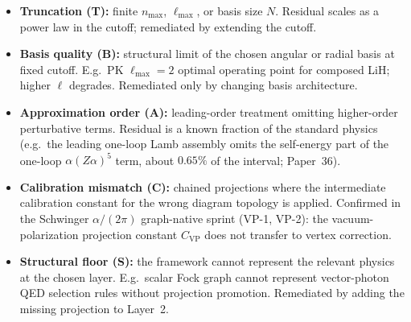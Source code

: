 \documentclass[11pt]{article}
\begin{document}
\begin{itemize}
\setlength\itemsep{0pt}
\item \textbf{Truncation (T):} finite $n_\text{max}$, $\ell_\text{max}$,
or basis size $N$.  Residual scales as a power law in the cutoff;
remediated by extending the cutoff.
\item \textbf{Basis quality (B):} structural limit of the chosen
angular or radial basis at fixed cutoff.  E.g.\ PK $\ell_\text{max}=2$
optimal operating point for composed LiH; higher $\ell$ degrades.
Remediated only by changing basis architecture.
\item \textbf{Approximation order (A):} leading-order treatment
omitting higher-order perturbative terms.  Residual is a known
fraction of the standard physics (e.g.\ the leading one-loop Lamb
assembly omits the self-energy part of the one-loop $\alpha(Z\alpha)^5$
term, about $0.65\%$ of the interval; Paper~36).
\item \textbf{Calibration mismatch (C):} chained projections where
the intermediate calibration constant for the wrong diagram
topology is applied.  Confirmed in the Schwinger $\alpha/(2\pi)$
graph-native sprint (VP-1, VP-2): the vacuum-polarization projection
constant $C_{\text{VP}}$ does not transfer to vertex correction.
\item \textbf{Structural floor (S):} the framework cannot represent
the relevant physics at the chosen layer.  E.g.\ scalar Fock graph
cannot represent vector-photon QED selection rules without
projection promotion.  Remediated by adding the missing projection
to Layer~2.
\end{itemize}
\end{document}
